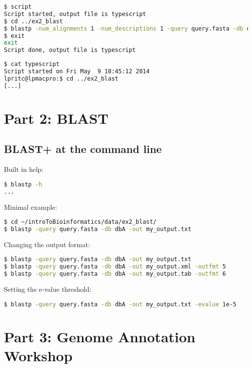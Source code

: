 \documentclass[a4paper]{article}
\begin{document}
\begin{lstlisting}[language=bash]
$ script
Script started, output file is typescript
$ cd ../ex2_blast
$ blastp -num_alignments 1 -num_descriptions 1 -query query.fasta -db dbA
$ exit
exit
Script done, output file is typescript
\end{lstlisting}

\begin{lstlisting}[language=bash]
$ cat typescript
Script started on Fri May  9 10:45:12 2014
lpritc@lpmacpro:$ cd ../ex2_blast
[...]
\end{lstlisting}

\section*{Part 2: BLAST}

\subsection*{BLAST+ at the command line}

Built in help:

\begin{lstlisting}[language=bash]
$ blastp -h
...
\end{lstlisting}

\pagebreak

Minimal example:

\begin{lstlisting}[language=bash]
$ cd ~/introToBioinformatics/data/ex2_blast/
$ blastp -query query.fasta -db dbA -out my_output.txt
\end{lstlisting}

Changing the output format:

\begin{lstlisting}[language=bash]
$ blastp -query query.fasta -db dbA -out my_output.txt
$ blastp -query query.fasta -db dbA -out my_output.xml -outfmt 5
$ blastp -query query.fasta -db dbA -out my_output.tab -outfmt 6
\end{lstlisting}

Setting the e-value threshold:

\begin{lstlisting}[language=bash]
$ blastp -query query.fasta -db dbA -out my_output.txt -evalue 1e-5
\end{lstlisting}

\section*{Part 3: Genome Annotation Workshop}
\end{document}
